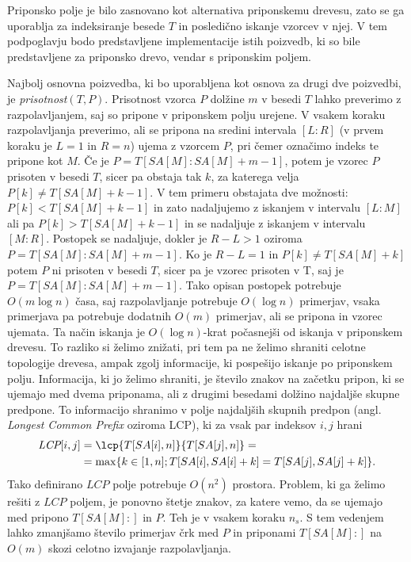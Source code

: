 Priponsko polje je bilo zasnovano kot alternativa priponskemu drevesu, zato se ga uporablja za indeksiranje besede $T$ in posledično iskanje vzorcev v njej. V tem podpoglavju bodo predstavljene implementacije istih poizvedb, ki so bile predstavljene za priponsko drevo, vendar s priponskim poljem.

Najbolj osnovna poizvedba, ki bo uporabljena kot osnova za drugi dve poizvedbi, je \textit{prisotnost}$(T,P)$. Prisotnost vzorca $P$ dolžine $m$ v besedi $T$ lahko preverimo z razpolavljanjem, saj so pripone v priponskem polju urejene. V vsakem koraku razpolavljanja preverimo, ali se pripona na sredini intervala $[L:R]$ (v prvem koraku je $L=1$ in $R=n$) ujema z vzorcem $P$, pri čemer označimo indeks te pripone kot $M$. Če je $P=T[SA[M]:SA[M]+m-1]$, potem je vzorec $P$ prisoten v besedi $T$, sicer pa obstaja tak $k$, za katerega velja $P[k]\ne T[SA[M]+k-1]$. V tem primeru obstajata dve možnosti: $P[k]<T[SA[M]+k-1]$ in zato nadaljujemo z iskanjem v intervalu $[L:M]$ ali pa $P[k]>T[SA[M]+k-1]$ in se nadaljuje z iskanjem v intervalu $[M:R]$. Postopek se nadaljuje, dokler je $R-L>1$ oziroma $P=T[SA[M]:SA[M]+m-1]$. Ko je $R-L=1$ in $P[k]\ne T[SA[M]+k]$ potem $P$ ni prisoten v besedi $T$, sicer pa je vzorec prisoten v T, saj je $P=T[SA[M]:SA[M]+m-1]$. Tako opisan postopek potrebuje $O(m\log{n})$ časa, saj razpolavljanje potrebuje $O(\log{n})$ primerjav, vsaka primerjava pa potrebuje dodatnih $O(m)$ primerjav, ali se pripona in vzorec ujemata. Ta način iskanja je $O(\log{n})$-krat počasnejši od iskanja v priponskem drevesu. To razliko si želimo znižati, pri tem pa ne želimo shraniti celotne topologije drevesa, ampak zgolj informacije, ki pospešijo iskanje po priponskem polju. Informacija, ki jo želimo shraniti, je število znakov na začetku pripon, ki se ujemajo med dvema priponama, ali z drugimi besedami dolžino najdaljše skupne predpone. To informacijo shranimo v polje najdaljših skupnih predpon (angl. \textit{Longest Common Prefix} oziroma LCP), ki za vsak par indeksov $i,j$ hrani
    \begin{equation*} 
        \begin{split}
        \textit{LCP}[i,j]&=\lcp{T[SA[i],n]}{T[SA[j],n]}=\\
         &=\max\{k\in[1,n];T[SA[i],SA[i]+k]=T[SA[j],SA[j]+k]\}.\\
        \end{split}
    \end{equation*}
Tako definirano $LCP$ polje potrebuje $O(n^2)$ prostora. Problem, ki ga želimo rešiti z $LCP$ poljem, je ponovno štetje znakov, za katere vemo, da se ujemajo med pripono $T[SA[M]:]$ in $P$. Teh je v vsakem koraku $n_s$. S tem vedenjem lahko zmanjšamo število primerjav črk med $P$ in priponami $T[SA[M]:]$ na $O(m)$ skozi celotno izvajanje razpolavljanja. 


